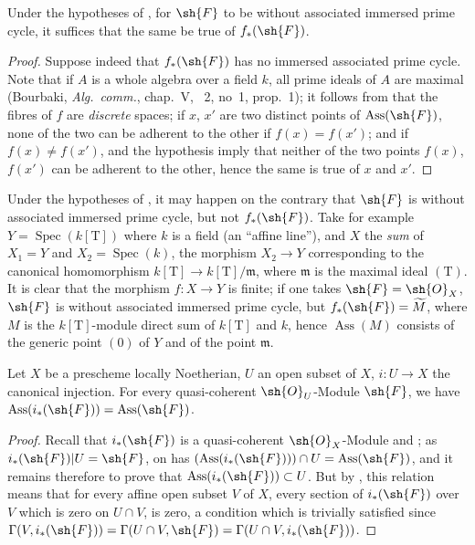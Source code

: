 \begin{corollary}[3.1.11]
\label{IV.3.1.11}
Under the hypotheses of , for $\sh{F}$ to be without associated immersed prime cycle, it suffices that the same be true of $f_*(\sh{F})$.
\end{corollary}

\begin{proof}
Suppose indeed that $f_*(\sh{F})$ has no immersed associated prime cycle.
Note that if $A$ is a whole algebra over a field $k$, all prime ideals of $A$ are maximal (Bourbaki, \emph{Alg.\ comm.}, chap.~V, \textsection~2, no~1, prop.~1); it follows from  that the fibres of $f$ are \emph{discrete} spaces; if $x$, $x'$ are two distinct points of $\operatorname{Ass}(\sh{F})$, none of the two can be adherent to the other if $f(x)=f(x')$; and if $f(x)\neq f(x')$,  and the hypothesis imply that neither of the two points $f(x)$, $f(x')$ can be adherent to the other, hence the same is true of $x$ and $x'$.
\end{proof}

\begin{remark}[3.1.12]
\label{IV.3.1.12}
Under the hypotheses of , it may happen on the contrary that $\sh{F}$ is without associated immersed prime cycle, but not $f_*(\sh{F})$.
Take for example $Y=\operatorname{Spec}(k[\mathrm{T}])$ where $k$ is a field (an ``affine line''), and $X$ the \emph{sum} of $X_1=Y$ and $X_2=\operatorname{Spec}(k)$, the morphism $X_2\to Y$ corresponding to the canonical homomorphism $k[\mathrm{T}]\to k[\mathrm{T}]/\mathfrak{m}$, where $\mathfrak{m}$ is the maximal ideal $(\mathrm{T})$.
It is clear that the morphism $f:X\to Y$ is finite; if one takes $\sh{F}=\sh{O}_X$, $\sh{F}$ is without associated immersed prime cycle, but $f_*(\sh{F})=\widetilde{M}$, where $M$ is the $k[\mathrm{T}]$-module direct sum of $k[\mathrm{T}]$ and $k$, hence $\operatorname{Ass}(M)$ consists of the generic point $(0)$ of $Y$ and of the point $\mathfrak{m}$.
\end{remark}

\begin{proposition}[3.1.13]
\label{IV.3.1.13}
Let $X$ be a prescheme locally Noetherian, $U$ an open subset of $X$, $i:U\to X$ the canonical injection.
For every quasi-coherent $\sh{O}_U$-Module $\sh{F}$, we have $\operatorname{Ass}(i_*(\sh{F}))=\operatorname{Ass}(\sh{F})$.
\end{proposition}

\begin{proof}
Recall that $i_*(\sh{F})$ is a quasi-coherent $\sh{O}_X$-Module  and ; as $i_*(\sh{F})|U=\sh{F}$, on has $({\operatorname{Ass}(i_*(\sh{F}))})\cap U=\operatorname{Ass}(\sh{F})$, and it remains therefore to prove that $\operatorname{Ass}(i_*(\sh{F}))\subset U$.
But by , this relation means that for every affine open subset $V$ of $X$, every section of $i_*(\sh{F})$ over $V$ which is zero on $U\cap V$, is zero, a condition which is trivially satisfied since $\Gamma(V,i_*(\sh{F}))=\Gamma(U\cap V,\sh{F})=\Gamma(U\cap V,i_*(\sh{F}))$.
\end{proof}

